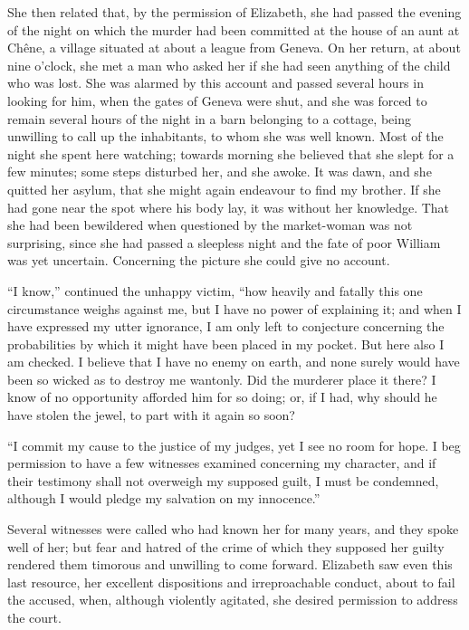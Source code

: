 \documentclass[12pt,openright]{book}
\begin{document}
She then related that, by the permission of Elizabeth, she had passed the evening of the night on which the murder had been committed at the house of an aunt at Chêne, a village situated at about a league from Geneva. On her return, at about nine o’clock, she met a man who asked her if she had seen anything of the child who was lost. She was alarmed by this account and passed several hours in looking for him, when the gates of Geneva were shut, and she was forced to remain several hours of the night in a barn belonging to a cottage, being unwilling to call up the inhabitants, to whom she was well known. Most of the night she spent here watching; towards morning she believed that she slept for a few minutes; some steps disturbed her, and she awoke. It was dawn, and she quitted her asylum, that she might again endeavour to find my brother. If she had gone near the spot where his body lay, it was without her knowledge. That she had been bewildered when questioned by the market-woman was not surprising, since she had passed a sleepless night and the fate of poor William was yet uncertain. Concerning the picture she could give no account.

“I know,” continued the unhappy victim, “how heavily and fatally this one circumstance weighs against me, but I have no power of explaining it; and when I have expressed my utter ignorance, I am only left to conjecture concerning the probabilities by which it might have been placed in my pocket. But here also I am checked. I believe that I have no enemy on earth, and none surely would have been so wicked as to destroy me wantonly. Did the murderer place it there? I know of no opportunity afforded him for so doing; or, if I had, why should he have stolen the jewel, to part with it again so soon?

“I commit my cause to the justice of my judges, yet I see no room for hope. I beg permission to have a few witnesses examined concerning my character, and if their testimony shall not overweigh my supposed guilt, I must be condemned, although I would pledge my salvation on my innocence.”

Several witnesses were called who had known her for many years, and they spoke well of her; but fear and hatred of the crime of which they supposed her guilty rendered them timorous and unwilling to come forward. Elizabeth saw even this last resource, her excellent dispositions and irreproachable conduct, about to fail the accused, when, although violently agitated, she desired permission to address the court.
\end{document}
